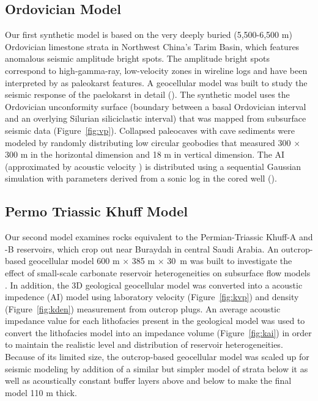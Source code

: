 \subsection{Ordovician Model}
\par
Our first synthetic model is based on the very deeply buried (5,500-6,500 m) Ordovician limestone strata in Northwest China's Tarim Basin, which features anomalous seismic amplitude bright spots. The amplitude bright spots correspond to high-gamma-ray, low-velocity zones in wireline logs and have been interpreted by \cite{zeng} as paleokarst features. A geocellular model was built to study the seismic response of the paelokarst in detail (\citealp{janson2010,zeng2}). The synthetic model uses the Ordovician unconformity surface (boundary between a basal Ordovician interval and an overlying Silurian siliciclastic interval) that was mapped from subsurface seismic data (Figure~\ref{fig:vp}). Collapsed paleocaves with cave sediments were modeled by randomly distributing low  circular geobodies that measured 300 $\times$ 300 m in the horizontal dimension and 18 m in vertical dimension. The AI (approximated by acoustic velocity ) is distributed using a sequential Gaussian simulation with parameters derived from a sonic log in the cored well (\citealp{janson2010,zeng,zeng2}).
\par
\subsection{Permo Triassic Khuff Model}
\par
Our second model examines rocks equivalent to the Permian-Triassic Khuff-A and -B reservoirs, which crop out near Buraydah in central Saudi Arabia. An outcrop-based geocellular model 600 m $\times$ 385 m $\times$ 30~m was built to investigate the effect of small-scale carbonate reservoir heterogeneities on subsurface flow models \cite[]{janson2013}. In addition, the 3D geological geocellular model was converted into a acoustic impedence (AI) model using laboratory velocity (Figure~\ref{fig:kvp}) and density (Figure~\ref{fig:kden}) measurement from outcrop plugs.  An average acoustic impedance value for each lithofacies present in the geological model was used to convert the lithofacies model into an impedance volume (Figure~\ref{fig:kai}) in order to maintain the realistic level and distribution of reservoir heterogeneities. Because of its limited size, the outcrop-based geocellular model was scaled up for seismic modeling by addition of a similar but simpler model of strata below it as well as acoustically constant buffer layers above and below to make the final model 110 m thick. 
